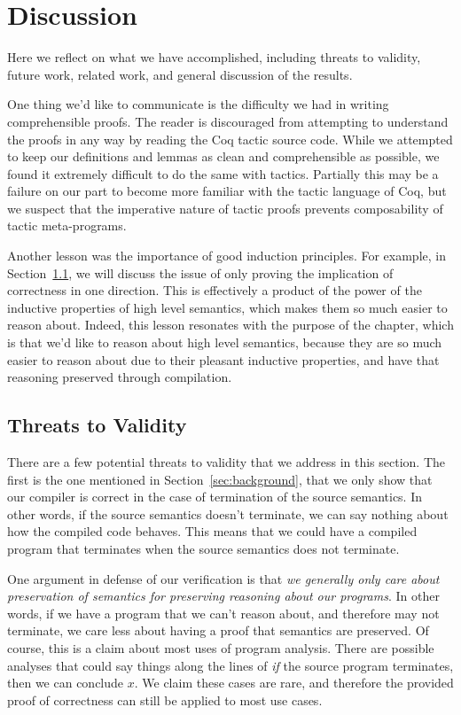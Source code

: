 \section{Discussion} \label{sec:discussion}

Here we reflect on what we have accomplished, including threats to validity,
future work, related work, and general discussion of the results.

One thing we'd like to communicate is the difficulty we had in writing
comprehensible proofs. The reader is discouraged from attempting to understand
the proofs in any way by reading the Coq tactic source code. While we attempted
to keep our definitions and lemmas as clean and comprehensible as possible, we
found it extremely difficult to do the same with tactics. Partially this may be
a failure on our part to become more familiar with the tactic language of Coq,
but we suspect that the imperative nature of tactic proofs prevents
composability of tactic meta-programs. 

Another lesson was the importance of good induction principles. For example, in
Section~\ref{sec:threats}, we will discuss the issue of only proving the
implication of correctness in one direction. This is effectively a product of
the power of the inductive properties of high level semantics, which makes them
so much easier to reason about. Indeed, this lesson resonates with the purpose
of the chapter, which is that we'd like to reason about high level semantics,
because they are so much easier to reason about due to their pleasant inductive
properties, and have that reasoning preserved through compilation. 

\subsection{Threats to Validity} \label{sec:threats}

There are a few potential threats to validity that we address in this section. The
first is the one mentioned in Section~\ref{sec:background}, that we only show
that our compiler is correct in the case of termination of the source semantics.
In other words, if the source semantics doesn't terminate, we can say nothing
about how the compiled code behaves. This means that we could have a compiled
program that terminates when the source semantics does not terminate.

One argument in defense of our verification is that \emph{we generally only care
about preservation of semantics for preserving reasoning about our programs}. In
other words, if we have a program that we can't reason about, and therefore may
not terminate, we care less about having a proof that semantics are preserved.
Of course, this is a claim about most uses of program analysis. There are
possible analyses that could say things along the lines of \emph{if} the source
program terminates, then we can conclude $x$. We claim these cases are rare, and
therefore the provided proof of correctness can still be applied to most use
cases.  

